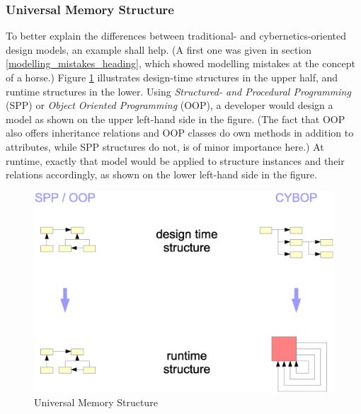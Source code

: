 %
%
%
%
%
%
%

\subsubsection{Universal Memory Structure}
\label{universal_memory_structure_heading}

To better explain the differences between traditional- and cybernetics-oriented
design models, an example shall help. (A first one was given in section
\ref{modelling_mistakes_heading}, which showed modelling mistakes at the
concept of a horse.) Figure \ref{universal_figure} illustrates design-time
structures in the upper half, and runtime structures in the lower. Using
\emph{Structured- and Procedural Programming} (SPP) or
\emph{Object Oriented Programming} (OOP), a developer would design a model as
shown on the upper left-hand side in the figure. (The fact that OOP also offers
inheritance relations and OOP classes do own methods in addition to attributes,
while SPP structures do not, is of minor importance here.) At runtime, exactly
that model would be applied to structure instances and their relations
accordingly, as shown on the lower left-hand side in the figure.

\begin{figure}[ht]
    \begin{center}
        \includegraphics[scale=0.2]{vector/universal.eps}
        \caption{Universal Memory Structure}
        \label{universal_figure}
    \end{center}
\end{figure}

